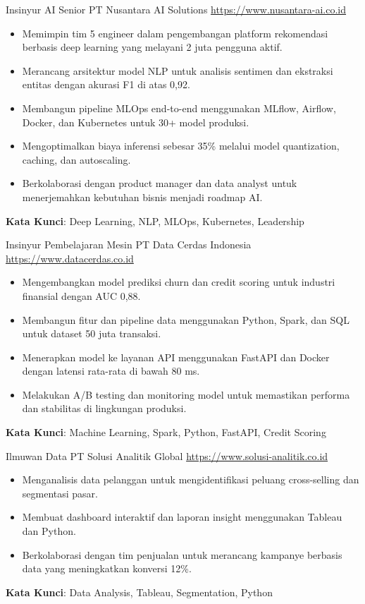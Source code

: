 \documentclass[a4paper, serif, 10pt]{moderncv}
\begin{document}
        {Insinyur AI Senior}
        {PT Nusantara AI Solutions}
        {\url{https://www.nusantara-ai.co.id}}
        {}
        {\begin{itemize}
\item Memimpin tim 5 engineer dalam pengembangan platform rekomendasi berbasis deep learning yang melayani 2 juta pengguna aktif.
\item Merancang arsitektur model NLP untuk analisis sentimen dan ekstraksi entitas dengan akurasi F1 di atas 0,92.
\item Membangun pipeline MLOps end-to-end menggunakan MLflow, Airflow, Docker, dan Kubernetes untuk 30+ model produksi.
\item Mengoptimalkan biaya inferensi sebesar 35\% melalui model quantization, caching, dan autoscaling.
\item Berkolaborasi dengan product manager dan data analyst untuk menerjemahkan kebutuhan bisnis menjadi roadmap AI.
\end{itemize}
\textbf{Kata Kunci}: Deep Learning, NLP, MLOps, Kubernetes, Leadership}

        {Insinyur Pembelajaran Mesin}
        {PT Data Cerdas Indonesia}
        {\url{https://www.datacerdas.co.id}}
        {}
        {\begin{itemize}
\item Mengembangkan model prediksi churn dan credit scoring untuk industri finansial dengan AUC 0,88.
\item Membangun fitur dan pipeline data menggunakan Python, Spark, dan SQL untuk dataset 50 juta transaksi.
\item Menerapkan model ke layanan API menggunakan FastAPI dan Docker dengan latensi rata-rata di bawah 80 ms.
\item Melakukan A/B testing dan monitoring model untuk memastikan performa dan stabilitas di lingkungan produksi.
\end{itemize}
\textbf{Kata Kunci}: Machine Learning, Spark, Python, FastAPI, Credit Scoring}

        {Ilmuwan Data}
        {PT Solusi Analitik Global}
        {\url{https://www.solusi-analitik.co.id}}
        {}
        {\begin{itemize}
\item Menganalisis data pelanggan untuk mengidentifikasi peluang cross-selling dan segmentasi pasar.
\item Membuat dashboard interaktif dan laporan insight menggunakan Tableau dan Python.
\item Berkolaborasi dengan tim penjualan untuk merancang kampanye berbasis data yang meningkatkan konversi 12\%.
\end{itemize}
\textbf{Kata Kunci}: Data Analysis, Tableau, Segmentation, Python}
\end{document}
